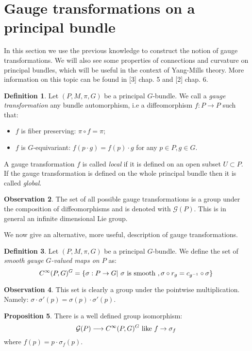 \documentclass[12pt,a4paper]{report}
\theoremstyle{definition}
\newtheorem{Def}{Definition}[chapter]
\theoremstyle{Theorem}
\newtheorem{Prop}[Def]{Proposition}
\theoremstyle{definition}
\theoremstyle{definition}
\newtheorem{Obs}[Def]{Observation}
\begin{document}
	\section{Gauge transformations on a principal bundle}
	In this section we use the previous knowledge to construct the notion of gauge transformations. We will also see some properties of connections and curvature on principal bundles, which will be useful in the context of Yang-Mills theory. More information on this topic can be found in [3] chap. 5 and [2] chap. 6.
	\begin{Def}
		Let $(P,M,\pi,G)$ be a principal $G$-bundle. We call a \textit{gauge transformation} any bundle automorphism, i.e a diffeomorphism $f:P\rightarrow P$ such that:
		\begin{itemize}
			\item $f$ is fiber preserving: $\pi\circ f=\pi$;
			\item $f$ is $G$-equivariant: $f(p\cdot g)=f(p)\cdot g$ for any $p\in P, g\in G$.
		\end{itemize}
		A gauge transformation $f$ is called \textit{local} if it is defined on an open subset $U\subset P$. If the gauge transformation is defined on the whole principal bundle then it is called \textit{global}.
	\end{Def}
	\begin{Obs}
		The set of all possible gauge transformations is a group under the composition of diffeomorphisms and is denoted with $\mathcal{G}(P)$. This is in general an infinite dimensional Lie group.
	\end{Obs}
	We now give an alternative, more useful, description of gauge transformations.
	\begin{Def}
		Let $(P,M,\pi,G)$ be a principal $G$-bundle. We define the set of \textit{smooth gauge $G$-valued maps on $P$} as:
		$$C^\infty(P,G)^G=\{\sigma:P\rightarrow G|\hbox{ }\sigma\hbox{ is smooth },\sigma\circ r_g=c_{g^{-1}}\circ \sigma\}$$
	\end{Def}
	\begin{Obs}
		This set is clearly a group under the pointwise multiplication. Namely:
		$\sigma\cdot \sigma'(p)=\sigma(p)\cdot \sigma'(p)$.
	\end{Obs}
	\begin{Prop}
		There is a well defined group isomorphism:
		$$\mathcal{G}(P)\longrightarrow C^\infty(P,G)^G\hbox{ like }f\rightarrow \sigma_f$$
		where $f(p)=p\cdot \sigma_f(p)$.
	\end{Prop}
\end{document}
